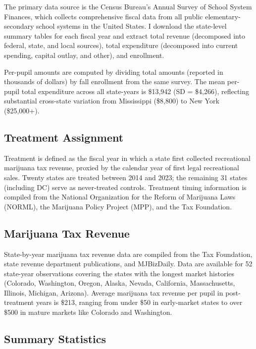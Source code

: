 \documentclass[12pt]{article}
\begin{document}
The primary data source is the Census Bureau's Annual Survey of School System Finances, which collects comprehensive fiscal data from all public elementary-secondary school systems in the United States. I download the state-level summary tables for each fiscal year and extract total revenue (decomposed into federal, state, and local sources), total expenditure (decomposed into current spending, capital outlay, and other), and enrollment.

Per-pupil amounts are computed by dividing total amounts (reported in thousands of dollars) by fall enrollment from the same survey. The mean per-pupil total expenditure across all state-years is \$13,942 (SD = \$4,266), reflecting substantial cross-state variation from Mississippi (\$8,800) to New York (\$25,000+).

\subsection{Treatment Assignment}

Treatment is defined as the fiscal year in which a state first collected recreational marijuana tax revenue, proxied by the calendar year of first legal recreational sales. Twenty states are treated between 2014 and 2023; the remaining 31 states (including DC) serve as never-treated controls. Treatment timing information is compiled from the National Organization for the Reform of Marijuana Laws (NORML), the Marijuana Policy Project (MPP), and the Tax Foundation.

\subsection{Marijuana Tax Revenue}

State-by-year marijuana tax revenue data are compiled from the Tax Foundation, state revenue department publications, and MJBizDaily. Data are available for 52 state-year observations covering the states with the longest market histories (Colorado, Washington, Oregon, Alaska, Nevada, California, Massachusetts, Illinois, Michigan, Arizona). Average marijuana tax revenue per pupil in post-treatment years is \$213, ranging from under \$50 in early-market states to over \$500 in mature markets like Colorado and Washington.

\subsection{Summary Statistics}
\end{document}
